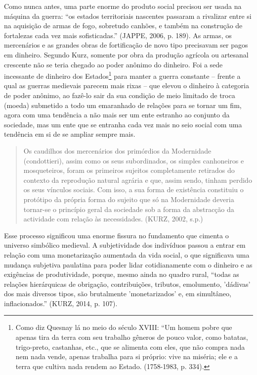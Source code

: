 Como nunca antes, uma parte enorme do produto social precisou ser usada
na máquina da guerra: ``os estados territoriais nascentes passaram a
rivalizar entre si na aquisição de armas de fogo, sobretudo canhões, e
também na construção de fortalezas cada vez mais sofisticadas.'' (JAPPE,
2006, p. 189). As armas, os mercenários e as grandes obras de
fortificação de novo tipo precisavam ser pagos em dinheiro. Segundo
Kurz, somente por obra da produção agrícola ou artesanal crescente não
se teria chegado ao poder anônimo do dinheiro. Foi a sede incessante de
dinheiro dos Estados\footnote{Como diz Quesnay lá no meio do século
  XVIII: ``Um homem pobre que apenas tira da terra com seu trabalho
  gêneros de pouco valor, como batatas, trigo-preto, castanhas, etc.,
  que se alimenta com eles, que não compra nada nem nada vende, apenas
  trabalha para si próprio: vive na miséria; ele e a terra que cultiva
  nada rendem ao Estado. (1758-1983, p. 334).} para manter a guerra
constante -- frente a qual as guerras medievais parecem mais rixas --
que elevou o dinheiro à categoria de poder anônimo, ao fazê-lo sair da
sua condição de meio limitado de troca (moeda) submetido a todo um
emaranhado de relações para se tornar um fim, agora com uma tendência a
não mais ser um ente estranho ao conjunto da sociedade, mas um ente que
se entranha cada vez mais no seio social com uma tendência em si de se
ampliar sempre mais.

\begin{quote}
Os caudilhos dos mercenários dos primórdios da Modernidade
(condottieri), assim como os seus subordinados, os simples canhoneiros e
mosqueteiros, foram os primeiros sujeitos completamente retirados do
contexto da reprodução natural agrária e que, assim sendo, tinham
perdido os seus vínculos sociais. Com isso, a sua forma de existência
constituiu o protótipo da própria forma do sujeito que só na Modernidade
deveria tornar-se o princípio geral da sociedade sob a forma da
abstracção da actividade com relação às necessidades. (KURZ, 2002, s.p.)
\end{quote}

Esse processo significou uma enorme fissura no fundamento que cimenta o
universo simbólico medieval. A subjetividade dos indivíduos passou a
entrar em relação com uma monetarização aumentada da vida social, o que
significava uma mudança subjetiva paulatina para poder lidar
cotidianamente com o dinheiro e as exigências de produtividade, porque,
mesmo ainda no quadro rural, ``todas as relações hierárquicas de
obrigação, contribuições, tributos, emolumento, 'dádivas' dos mais
diversos tipos, são brutalmente 'monetarizados' e, em simultâneo,
inflacionados.'' (KURZ, 2014, p. 107).

